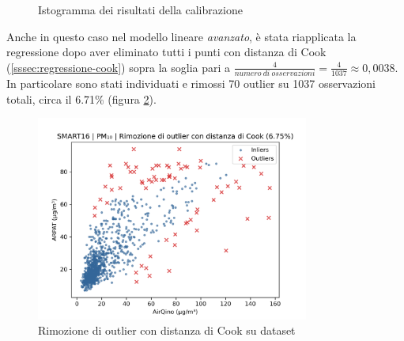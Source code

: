 \begin{figure}[H]%
    \centering
    \captionsetup{justification=centering}
    \caption{Istogramma dei risultati della calibrazione }%
    \label{fig:risultati-pm10-hist}%
\end{figure}

\clearpage

Anche in questo caso nel modello lineare \textit{avanzato}, è stata riapplicata la regressione dopo aver eliminato tutti i punti con distanza di Cook (\ref{sssec:regressione-cook}) sopra la soglia pari a $\frac{4}{numero\ di\ osservazioni} = \frac{4}{1037} \approx 0,0038$. In particolare sono stati individuati e rimossi 70 outlier su 1037 osservazioni totali, circa il 6.71\% (figura \ref{fig:cook-pm10}).

\begin{figure}[H]
\centering
\includegraphics[width=0.80\textwidth,height=\textheight,keepaspectratio]{img/cook_pm10.png}
\caption{Rimozione di outlier con distanza di Cook su dataset }%
\label{fig:cook-pm10}%
\end{figure}


